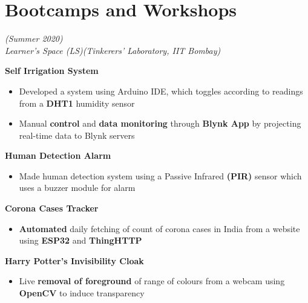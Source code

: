 \documentclass[a4paper]{article}
\newcommand{\lhs}[1]{{\textit{#1}}}
\newcommand{\rhsmall}[1]{\hfill{\footnotesize{\textsl{(#1)}}}}
\newcommand{\rhse}[1]{\hfill{\small{\textsl{(#1)}}}\\[-12pt]}
\newcommand{\head}[1]{{\CFont{\textbf{#1}}}}
\newcommand{\CFont}{\fontsize{11}{13.2}\selectfont}
\begin{document}
\section{Bootcamps and Workshops}
\head{Tinkering Bootcamp}\rhsmall{Summer 2020}\\
\lhs{Learner's Space (LS)}\rhse{Tinkerers' Laboratory, IIT Bombay}
\begin{description}
	\item \textbf{\hspace{0em} Self Irrigation System}
\end{description}
\begin{itemize}[leftmargin=1.8em]
	\item Developed a system using Arduino IDE, which toggles according to readings from a \textbf{DHT1} humidity sensor
	\item Manual \textbf{control} and \textbf{data monitoring} through \textbf{Blynk App} by projecting real-time data to Blynk servers 
\end{itemize}
\begin{description}
	\item \textbf{\hspace{0em} Human Detection Alarm} 
\end{description}
\begin{itemize}[leftmargin=1.8em]
	\item Made human detection system using a Passive Infrared \textbf{(PIR)} sensor which uses a buzzer module for alarm %
\end{itemize}
\begin{description}
	\item \textbf{\hspace{0em} Corona Cases Tracker} 
\end{description}
\begin{itemize}[leftmargin=1.8em]
	\item \textbf{Automated} daily fetching of count of corona cases in India from a website using \textbf{ESP32} and \textbf{ThingHTTP}
\end{itemize}
\begin{description}
	\item \textbf{\hspace{0em} Harry Potter's Invisibility Cloak}
\end{description}
\begin{itemize}[leftmargin=1.8em]
	\item Live \textbf{removal of foreground} of range of colours from a webcam using \textbf{OpenCV} to induce transparency
\end{itemize}
\end{document}
